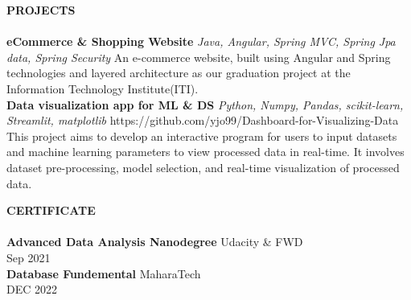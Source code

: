 \documentclass[a4paper]{article}
\newcommand{\lineunder} {
    \vspace*{-5pt} \\
    \hspace*{-18pt} \hrulefill \\
}
\newcommand{\header} [1] {
    {\hspace*{-18pt}\vspace*{6pt} \textsc{#1}}
    \vspace*{-6pt} \lineunder
}
\begin{document}
\header{\textbf{PROJECTS}}
{\textbf{eCommerce & Shopping Website}} {\sl Java, Angular, Spring MVC, Spring Jpa data, Spring Security  } \hfill 
\vspace{5pt}
An e-commerce website, built using Angular and Spring technologies and layered architecture as our graduation project at the Information Technology Institute(ITI).\\
\vspace*{2mm}
\vspace{10pt}
{\textbf{Data visualization app for ML \& DS}} {\sl Python, Numpy, Pandas, scikit-learn, Streamlit, matplotlib} \hfill 
\vspace{5pt}
https://github.com/yjo99/Dashboard-for-Visualizing-Data\\
  \vspace{5pt}
  This project aims to develop an interactive program for users to input datasets and machine learning parameters to view processed data in real-time. It involves dataset pre-processing, model selection, and real-time visualization of processed data.\\
\vspace*{2mm}

\header{\textbf{CERTIFICATE}}
\vspace{5pt}
\textbf{Advanced Data Analysis Nanodegree} \hfill Udacity \& FWD\\
\hfill Sep 2021\\
\textbf{Database Fundemental} \hfill MaharaTech \\
\hfill DEC 2022\\

\vspace*{2mm}

\ 
\end{document}
